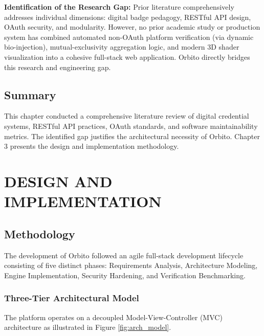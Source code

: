 \documentclass[12pt,a4paper]{article}
\begin{document}
\noindent
\textbf{Identification of the Research Gap:} Prior literature comprehensively addresses individual dimensions: digital badge pedagogy, RESTful API design, OAuth security, and modularity. However, no prior academic study or production system has combined automated non-OAuth platform verification (via dynamic bio-injection), mutual-exclusivity aggregation logic, and modern 3D shader visualization into a cohesive full-stack web application. Orbito directly bridges this research and engineering gap.

\subsection{Summary}
This chapter conducted a comprehensive literature review of digital credential systems, RESTful API practices, OAuth standards, and software maintainability metrics. The identified gap justifies the architectural necessity of Orbito. Chapter 3 presents the design and implementation methodology.

\newpage

\section{DESIGN AND IMPLEMENTATION}

\subsection{Methodology}
The development of Orbito followed an agile full-stack development lifecycle consisting of five distinct phases: Requirements Analysis, Architecture Modeling, Engine Implementation, Security Hardening, and Verification Benchmarking.

\subsubsection{Three-Tier Architectural Model}
The platform operates on a decoupled Model-View-Controller (MVC) architecture as illustrated in Figure \ref{fig:arch_model}.
\end{document}
